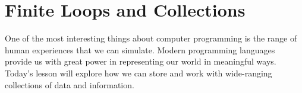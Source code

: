 
\chapter{Finite Loops and Collections}
\label{day:graphics-programming}


\minitoc

One of the most interesting things about computer programming is the range of human experiences that we can simulate.  Modern programming languages provide us with great power in representing our world in meaningful ways.  Today's lesson will explore how we can store and work with wide-ranging collections of data and information.